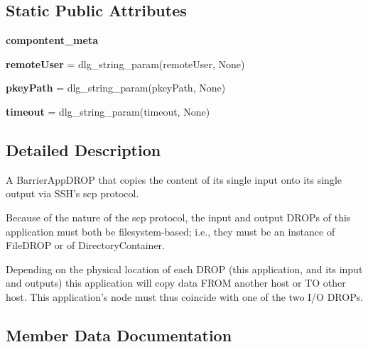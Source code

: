 \subsection*{Static Public Attributes}
\begin{DoxyCompactItemize}
\item 
{\bfseries compontent\+\_\+meta}
\item 
\mbox{\label{classdlg_1_1apps_1_1scp_1_1_scp_app_accb5a84a4d9c133cdf73d0373a061efb}} 
{\bfseries remote\+User} = dlg\+\_\+string\+\_\+param(\textquotesingle{}remote\+User\textquotesingle{}, None)
\item 
\mbox{\label{classdlg_1_1apps_1_1scp_1_1_scp_app_a3eb8b7a01b4d112673c7059a6b61d707}} 
{\bfseries pkey\+Path} = dlg\+\_\+string\+\_\+param(\textquotesingle{}pkey\+Path\textquotesingle{}, None)
\item 
\mbox{\label{classdlg_1_1apps_1_1scp_1_1_scp_app_acda7ccdf3a0f0927eb5fe1293c1feb57}} 
{\bfseries timeout} = dlg\+\_\+string\+\_\+param(\textquotesingle{}timeout\textquotesingle{}, None)
\end{DoxyCompactItemize}


\subsection{Detailed Description}
\begin{DoxyVerb}A BarrierAppDROP that copies the content of its single input onto its
single output via SSH's scp protocol.

Because of the nature of the scp protocol, the input and output DROPs
of this application must both be filesystem-based; i.e., they must be an
instance of FileDROP or of DirectoryContainer.

Depending on the physical location of each DROP (this application, and
its input and outputs) this application will copy data FROM another host or
TO other host. This application's node must thus coincide with one of the
two I/O DROPs.
\end{DoxyVerb}
 

\subsection{Member Data Documentation}
\mbox{\label{classdlg_1_1apps_1_1scp_1_1_scp_app_a92459ac0fe6ec7b89b4d92e96463917a}} 
